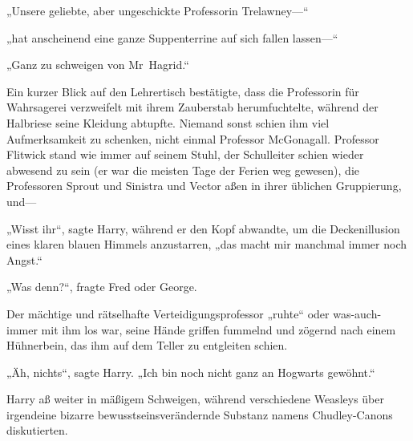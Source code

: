 „Unsere geliebte, aber ungeschickte Professorin Trelawney—“

„hat anscheinend eine ganze Suppenterrine auf sich fallen lassen—“

„Ganz zu schweigen von Mr~Hagrid.“

Ein kurzer Blick auf den Lehrertisch bestätigte, dass die Professorin für Wahrsagerei verzweifelt mit ihrem Zauberstab herumfuchtelte, während der Halbriese seine Kleidung abtupfte. Niemand sonst schien ihm viel Aufmerksamkeit zu schenken, nicht einmal Professor McGonagall. Professor Flitwick stand wie immer auf seinem Stuhl, der Schulleiter schien wieder abwesend zu sein (er war die meisten Tage der Ferien weg gewesen), die Professoren Sprout und Sinistra und Vector aßen in ihrer üblichen Gruppierung, und—

„Wisst ihr“, sagte Harry, während er den Kopf abwandte, um die Deckenillusion eines klaren blauen Himmels anzustarren, „das macht mir manchmal immer noch Angst.“

„Was denn?“, fragte Fred oder George.

Der mächtige und rätselhafte Verteidigungsprofessor „ruhte“ oder was-auch-immer mit ihm los war, seine Hände griffen fummelnd und zögernd nach einem Hühnerbein, das ihm auf dem Teller zu entgleiten schien.

„Äh, nichts“, sagte Harry.
„Ich bin noch nicht ganz an Hogwarts gewöhnt.“

Harry aß weiter in mäßigem Schweigen, während verschiedene Weasleys über irgendeine bizarre bewusstseinsverändernde Substanz namens Chudley-Canons diskutierten.

